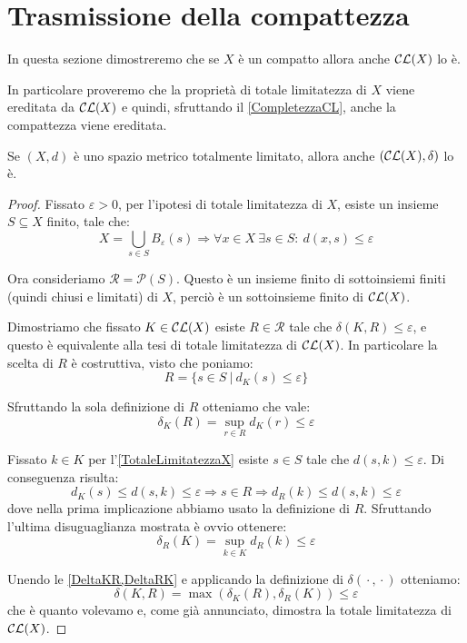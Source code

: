 \section{Trasmissione della compattezza}
In questa sezione dimostreremo che se $X$ è un compatto allora anche $\mathcal{CL}(X)$ lo è. 

In particolare proveremo che la proprietà di totale limitatezza di $X$ viene ereditata da $\mathcal{CL}(X)$ e quindi, sfruttando il \cref{CompletezzaCL}, anche la compattezza viene ereditata.

\begin{lemma}\label{TotaleLimitatezzaCL}
	Se $(X,d)$ è uno spazio metrico totalmente limitato, allora anche $(\mathcal{CL}(X),\delta)$ lo è.
\end{lemma}
\begin{proof}
	Fissato $\varepsilon>0$, per l'ipotesi di totale limitatezza di $X$, esiste un insieme $S\subseteq X$ finito, tale che:
	\begin{equation}\label{TotaleLimitatezzaX}
		X=\bigcup_{s\in S} B_{\varepsilon}(s) \Longrightarrow 
		\forall x\in X\ \exists s\in S:\ d(x,s)\le \varepsilon
	\end{equation}

	Ora consideriamo $\mathcal{R}=\mathcal{P}(S)$. Questo è un insieme finito di sottoinsiemi finiti (quindi chiusi e limitati) di $X$, perciò è un sottoinsieme finito di $\mathcal{CL}(X)$. 
	
	Dimostriamo che fissato $K\in\mathcal{CL}(X)$ esiste $R\in \mathcal{R}$ tale che $\delta(K,R)\le \varepsilon$, e questo è equivalente alla tesi di totale limitatezza di $\mathcal{CL}(X)$. In particolare la scelta di $R$ è costruttiva, visto che poniamo:
	\begin{equation*}
		R=\{s\in S\ |\ d_K(s)\le \varepsilon\}
	\end{equation*}
	
	Sfruttando la sola definizione di $R$ otteniamo che vale:
	\begin{equation}\label{DeltaKR}
		\delta_K(R)=\sup_{r\in R} d_K(r) \le \varepsilon
	\end{equation}
	
	Fissato $k\in K$ per l'\cref{TotaleLimitatezzaX} esiste $s\in S$ tale che $d(s,k)\le \varepsilon$. Di conseguenza risulta:
	\begin{equation*}
		d_K(s)\le d(s,k) \le \varepsilon \Longrightarrow s\in R \Longrightarrow d_R(k)\le d(s,k)\le \varepsilon
	\end{equation*}
	dove nella prima implicazione abbiamo usato la definizione di $R$. 
	Sfruttando l'ultima disuguaglianza mostrata è ovvio ottenere:
	\begin{equation}\label{DeltaRK}
		\delta_R(K)=\sup_{k\in K} d_R(k) \le  \varepsilon
	\end{equation}
	
	Unendo le \cref{DeltaKR,DeltaRK} e applicando la definizione di $\delta({}\cdot{},{}\cdot{})$ otteniamo:
	\begin{equation*}
		\delta(K,R)=\max\left(\delta_K(R),\delta_R(K)\right)\le \varepsilon
	\end{equation*}
	che è quanto volevamo e, come già annunciato, dimostra la totale limitatezza di $\mathcal{CL}(X)$.
\end{proof}

